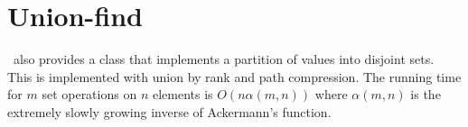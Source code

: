 \section{Union-find}

\cgal\ also provides a class  that implements a partition
of values into disjoint sets.  This is implemented with union by rank and
path compression.  The running time for $m$ set operations on $n$ elements
is $O(n\alpha(m,n))$ where $\alpha(m,n)$ is the extremely slowly growing
inverse of Ackermann's function.
